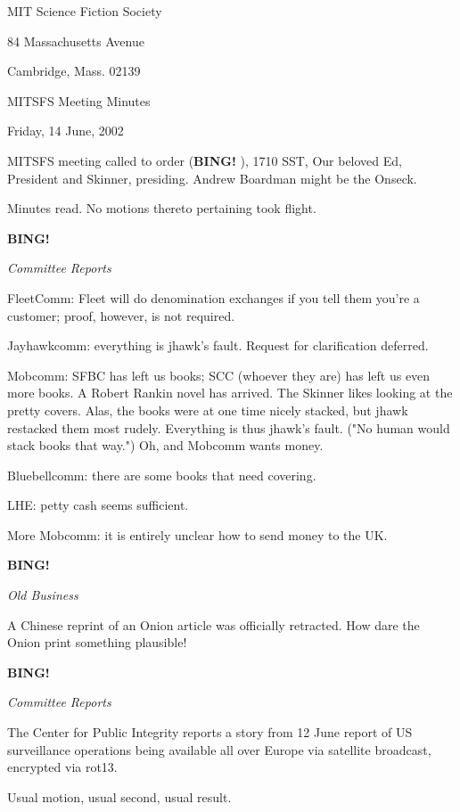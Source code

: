 \documentclass[12pt]{article}
\newcommand{\bing}{{\bf BING!} }
\newcommand{\goto}[1]{\bing \vskip 12pt \centerline{{\em{#1}}}}
\begin{document}
\begin{center}

MIT Science Fiction Society 

84 Massachusetts Avenue

Cambridge, Mass.  02139

\vspace{12pt}

MITSFS Meeting Minutes 

Friday, 14 June, 2002

\end{center}
 
\vspace{18pt}

\setlength{\parskip}{6pt}

\noindent
MITSFS meeting called to order (\bing), 1710 SST, Our beloved Ed,
President and Skinner, presiding.  Andrew Boardman might be the Onseck.

Minutes read.  No motions thereto pertaining took flight.

\goto{Committee Reports}

FleetComm: Fleet will do denomination exchanges if you tell them you're a
customer; proof, however, is not required.

Jayhawkcomm: everything is jhawk's fault.  Request for clarification
deferred.

Mobcomm: SFBC has left us books; SCC (whoever they are) has left us even
more books.  A Robert Rankin novel has arrived.  The Skinner likes
looking at the pretty covers.  Alas, the books were at one time nicely
stacked, but jhawk restacked them most rudely.  Everything is thus
jhawk's fault.  ("No human would stack books that way.")  Oh, and Mobcomm
wants money.

Bluebellcomm: there are some books that need covering.

LHE: petty cash seems sufficient.

More Mobcomm: it is entirely unclear how to send money to the UK.

\goto{Old Business}

A Chinese reprint of an Onion article was officially retracted.  How dare
the Onion print something plausible!

\goto{Committee Reports}

The Center for Public Integrity reports a story from 12 June report of US
surveillance operations being available all over Europe via satellite
broadcast, encrypted via rot13.

Usual motion, usual second, usual result.
\end{document}
